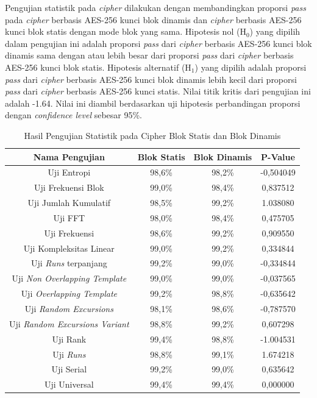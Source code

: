 Pengujian statistik pada \emph{cipher} dilakukan dengan membandingkan proporsi \emph{pass} pada \emph{cipher} berbasis AES-256 kunci blok dinamis dan \emph{cipher} berbasis AES-256 kunci blok statis dengan mode blok yang sama. Hipotesis nol ($\text{H}_0$) yang dipilih dalam pengujian ini adalah proporsi \emph{pass} dari \emph{cipher} berbasis AES-256 kunci blok dinamis sama dengan atau lebih besar dari proporsi \emph{pass} dari \emph{cipher} berbasis AES-256 kunci blok statis. Hipotesis alternatif ($\text{H}_1$) yang dipilih adalah proporsi \emph{pass} dari \emph{cipher} berbasis AES-256 kunci blok dinamis lebih kecil dari proporsi \emph{pass} dari \emph{cipher} berbasis AES-256 kunci statis. Nilai titik kritis dari pengujian ini adalah -1.64. Nilai ini diambil berdasarkan uji hipotesis perbandingan proporsi dengan \emph{confidence level} sebesar 95\%.

\begin{table}[!h]
  \centering
  \caption{Hasil Pengujian Statistik pada Cipher Blok Statis dan Blok Dinamis} \label{tab:test.statistic.cipher}
  \begin{tabular}{|c|c|c|c|}
    \hline
    Nama Pengujian & Blok Statis & Blok Dinamis & P-Value \\ \hline
    Uji Entropi & 98,6\% & 98,2\% & -0,504049 \\ \hline
    Uji Frekuensi Blok & 99,0\% & 98,4\% & 0,837512 \\ \hline
    Uji Jumlah Kumulatif & 98,5\% & 99,2\% & 1.038080 \\ \hline
    Uji FFT & 98,0\% & 98,4\% & 0,475705 \\ \hline
    Uji Frekuensi & 98,6\% & 99,2\% & 0,909550 \\ \hline
    Uji Kompleksitas Linear & 99,0\% & 99,2\% & 0,334844 \\ \hline
    Uji \emph{Runs} terpanjang & 99,2\% & 99,0\% & -0,334844 \\ \hline
    Uji \emph{Non Overlapping Template} & 99,0\% & 99,0\% & -0,037565 \\ \hline
    Uji \emph{Overlapping Template} & 99,2\% & 98,8\% & -0,635642 \\ \hline
    Uji \emph{Random Excursions} & 98,1\% & 98,6\% & -0,787570 \\ \hline
    Uji \emph{Random Excursions Variant} & 98,8\% & 99,2\% & 0,607298 \\ \hline
    Uji Rank & 99,4\% & 98,8\% & -1.004531 \\ \hline
    Uji \emph{Runs} & 98,8\% & 99,1\% & 1.674218 \\ \hline
    Uji Serial & 99,2\% & 99,0\% & 0,635642 \\ \hline
    Uji Universal & 99,4\% & 99,4\% & 0,000000 \\ \hline
  \end{tabular}
\end{table}

